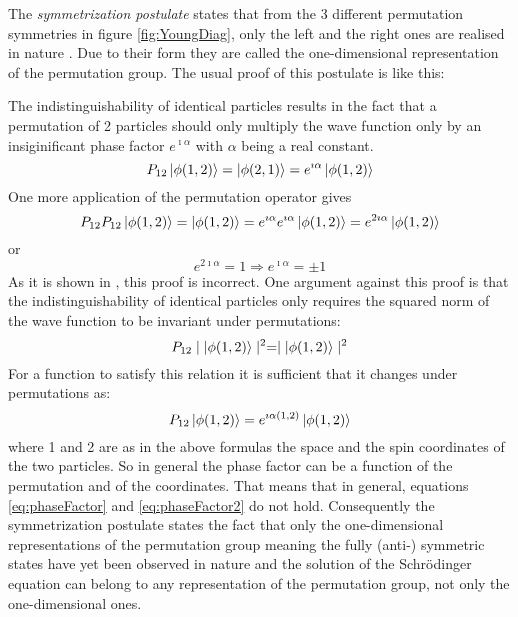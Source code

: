 The \textit{symmetrization postulate} states that from the 3 different permutation symmetries in figure \ref{fig:YoungDiag}, only the left and the right ones are realised in nature \cite{Messiah1964}. Due to their form they are called the one-dimensional representation of the permutation group. The usual proof of this postulate is like this:

The indistinguishability of identical particles results in the fact that a permutation of 2 particles should only multiply the wave function only by an insiginificant phase factor $e^{\imath\alpha}$ with $\alpha$ being a real constant.
\begin{equation}
 P_{12}\ket{\phi(1,2)} = \ket{\phi(2,1)} = e^{\imath\alpha}\ket{\phi(1,2)}
\end{equation} 
One more application of the permutation operator gives
\begin{equation}
\label{eq:phaseFactor}
 P_{12}P_{12}\ket{\phi(1,2)} =  \ket{\phi(1,2)} = e^{\imath\alpha}e^{\imath\alpha}\ket{\phi(1,2)} = e^{2\imath\alpha}\ket{\phi(1,2)}
\end{equation} 
or
\begin{equation}
\label{eq:phaseFactor2}
 e^{2\imath\alpha} = 1 \Rightarrow e^{\imath\alpha} = \pm 1
\end{equation} 
As it is shown in \cite{Kaplan2013}, this proof is incorrect. One argument against this proof is that the indistinguishability of identical particles only requires the squared norm of the wave function to be invariant under permutations:
\begin{equation}
 P_{12}\mid\ket{\phi(1,2)}\mid^{2} = \mid\ket{\phi(1,2)}\mid^{2}
\end{equation} 
For a function to satisfy this relation it is sufficient that it changes under permutations as:
\begin{equation}
 P_{12}\ket{\phi(1,2)} = e^{\imath\alpha(1,2)}\ket{\phi(1,2)}
\end{equation} 
where 1 and 2 are as in the above formulas the space and the spin coordinates of the two particles. So in general the phase factor can be a function of the permutation and of the coordinates. That means that in general, equations \ref{eq:phaseFactor} and \ref{eq:phaseFactor2} do not hold. Consequently the symmetrization postulate states the fact that only the one-dimensional representations of the permutation group meaning the fully (anti-) symmetric states have yet been observed in nature and the solution of the Schrödinger equation can belong to any representation of the permutation group, not only the one-dimensional ones.


